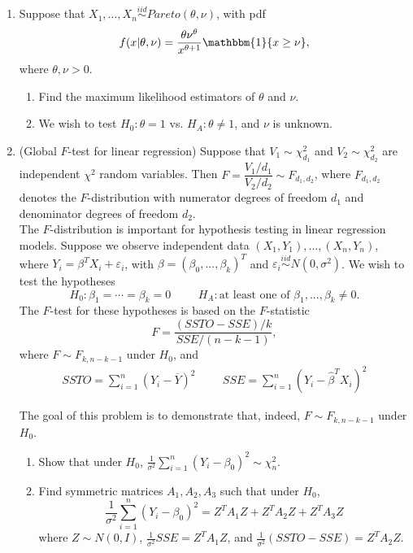 \documentclass[11pt]{article}
\begin{document}
\begin{enumerate}
\item Suppose that $X_1,...,X_n \overset{iid}{\sim} Pareto(\theta, \nu)$, with pdf
$$f(x |\theta, \nu) = \dfrac{\theta \nu^{\theta}}{x^{\theta + 1}} \mathbbm{1}\{x \geq \nu\},$$
where $\theta, \nu > 0$. 

\begin{enumerate}
\item Find the maximum likelihood estimators of $\theta$ and $\nu$.

\item We wish to test $H_0: \theta = 1$ vs. $H_A: \theta \neq 1$, and $\nu$ is unknown.
\end{enumerate}

\item (Global $F$-test for linear regression) Suppose that $V_1 \sim \chi^2_{d_1}$ and $V_2 \sim \chi^2_{d_2}$ are independent $\chi^2$ random variables. Then $F = \dfrac{V_1/d_1}{V_2/d_2} \sim F_{d_1, d_2}$, where $F_{d_1, d_2}$ denotes the $F$-distribution with numerator degrees of freedom $d_1$ and denominator degrees of freedom $d_2$.\\

The $F$-distribution is important for hypothesis testing in linear regression models. Suppose we observe independent data $(X_1, Y_1),...,(X_n, Y_n)$, where $Y_i = \beta^T X_i + \varepsilon_i$, with $\beta = (\beta_0, ..., \beta_k)^T$ and $\varepsilon_i \overset{iid}{\sim} N(0, \sigma^2)$. We wish to test the hypotheses
$$H_0: \beta_1 = \cdots = \beta_k = 0 \hspace{1cm} H_A: \text{at least one of } \beta_1,...,\beta_k \neq 0.$$
The $F$-test for these hypotheses is based on the $F$-statistic
$$F = \dfrac{(SSTO - SSE)/k}{SSE/(n - k - 1)},$$
where $F \sim F_{k, n-k-1}$ under $H_0$, and
\begin{align*}
SSTO = \sum \limits_{i=1}^n (Y_i - \overline{Y})^2 \hspace{1cm} SSE = \sum \limits_{i=1}^n (Y_i - \widehat{\beta}^T X_i)^2
\end{align*}

The goal of this problem is to demonstrate that, indeed, $F \sim F_{k, n-k-1}$ under $H_0$.

\begin{enumerate}
\item Show that under $H_0$, $\frac{1}{\sigma^2}\sum \limits_{i=1}^n (Y_i - \beta_0)^2 \sim \chi^2_n$.

\item Find symmetric matrices $A_1, A_2, A_3$ such that under $H_0$, 
$$\frac{1}{\sigma^2}\sum \limits_{i=1}^n (Y_i - \beta_0)^2 = Z^T A_1 Z + Z^T A_2 Z + Z^T A_3 Z$$
where $Z \sim N(0, I)$, $\frac{1}{\sigma^2} SSE = Z^T A_1 Z$, and $\frac{1}{\sigma^2} (SSTO - SSE) = Z^T A_2 Z$.


\end{enumerate}
\end{enumerate}
\end{document}
